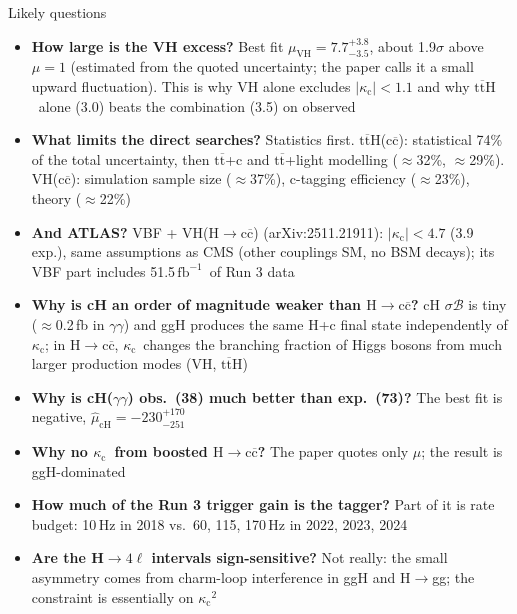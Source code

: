 \documentclass[aspectratio=169,10pt,xcolor=table]{beamer}
\newcommand{\qbar}[1]{\mathrm{#1}\overline{\mathrm{#1}}}
\newcommand{\ccbar}{\ensuremath{\qbar{c}}}
\newcommand{\kc}{\ensuremath{\kappa_\mathrm{c}}}
\newcommand{\Hcc}{\ensuremath{\mathrm{H}\to\qbar{c}}}
\newcommand{\ttH}{\ensuremath{\qbar{t}\mathrm{H}}}
\newcommand{\ttbar}{\ensuremath{\qbar{t}}}
\newcommand{\fbinv}{\ensuremath{\,\mathrm{fb}^{-1}}}
\begin{document}
\begin{frame}{Likely questions}
  \footnotesize
  \begin{itemize}
    \item \textbf{How large is the VH excess?} Best fit $\mu_\mathrm{VH} = 7.7^{+3.8}_{-3.5}$, about 1.9$\sigma$ above $\mu=1$ (estimated from the quoted uncertainty; the paper calls it a small upward fluctuation). This is why VH alone excludes $|\kc|<1.1$ and why \ttH\ alone (3.0) beats the combination (3.5) on observed
    \item \textbf{What limits the direct searches?} Statistics first. \ttH(\ccbar): statistical 74\% of the total uncertainty, then \ttbar+c and \ttbar+light modelling ($\approx$32\%, $\approx$29\%). VH(\ccbar): simulation sample size ($\approx$37\%), c-tagging efficiency ($\approx$23\%), theory ($\approx$22\%)
    \item \textbf{And ATLAS?} VBF + VH(\Hcc) (arXiv:2511.21911): $|\kc| < 4.7$ (3.9 exp.), same assumptions as CMS (other couplings SM, no BSM decays); its VBF part includes 51.5\fbinv\ of Run 3 data
    \item \textbf{Why is cH an order of magnitude weaker than \Hcc?} cH $\sigma\mathcal{B}$ is tiny ($\approx$0.2\,fb in $\gamma\gamma$) and ggH produces the same H+c final state independently of \kc; in \Hcc, \kc\ changes the branching fraction of Higgs bosons from much larger production modes (VH, \ttH)
    \item \textbf{Why is cH($\gamma\gamma$) obs.\ (38) much better than exp.\ (73)?} The best fit is negative, $\hat\mu_\mathrm{cH} = -230^{+170}_{-251}$
    \item \textbf{Why no \kc\ from boosted \Hcc?} The paper quotes only $\mu$; the result is ggH-dominated
    \item \textbf{How much of the Run 3 trigger gain is the tagger?} Part of it is rate budget: 10\,Hz in 2018 vs.\ 60, 115, 170\,Hz in 2022, 2023, 2024
    \item \textbf{Are the H$\to4\ell$ intervals sign-sensitive?} Not really: the small asymmetry comes from charm-loop interference in ggH and H$\to$gg; the constraint is essentially on $\kc^2$
  \end{itemize}
\end{frame}
\end{document}

